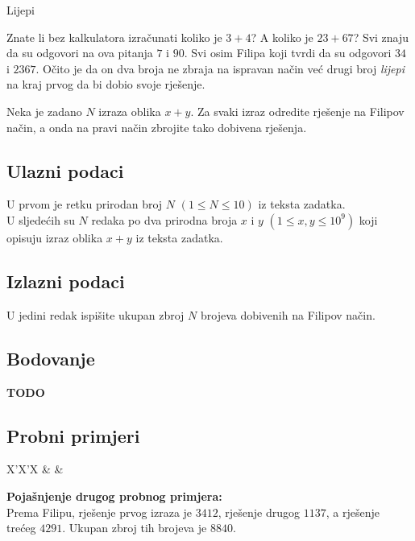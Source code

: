 \begin{statement}[
  problempoints=30,
  timelimit=1 sekunda,
  memorylimit=512 MiB,
]{Lijepi}

Znate li bez kalkulatora izračunati koliko je $3+4$? A koliko je $23+67$? Svi
znaju da su odgovori na ova pitanja $7$ i $90$. Svi osim Filipa koji tvrdi da
su odgovori $34$ i $2367$. Očito je da on dva broja ne zbraja na ispravan način
već drugi broj \textit{lijepi} na kraj prvog da bi dobio svoje rješenje.

Neka je zadano $N$ izraza oblika $x+y$. Za svaki izraz odredite rješenje na
Filipov način, a onda na pravi način zbrojite tako dobivena rješenja.

\subsection*{Ulazni podaci}
U prvom je retku prirodan broj $N$ $(1 \le N \le 10)$ iz teksta zadatka. \\
U sljedećih su $N$ redaka po dva prirodna broja $x$ i $y$ $(1 \le x, y \le 10^9)$
koji opisuju izraz oblika $x+y$ iz teksta zadatka.

\subsection*{Izlazni podaci}
U jedini redak ispišite ukupan zbroj $N$ brojeva dobivenih na Filipov način.

\subsection*{Bodovanje}
\textbf{TODO}

\subsection*{Probni primjeri}
\begin{tabularx}{\textwidth}{X'X'X}
 &
 &
\end{tabularx}

\textbf{Pojašnjenje drugog probnog primjera:} \\
Prema Filipu, rješenje prvog izraza je $3412$, rješenje drugog $1137$, a
rješenje trećeg $4291$. Ukupan zbroj tih brojeva je $8840$.

\end{statement}

